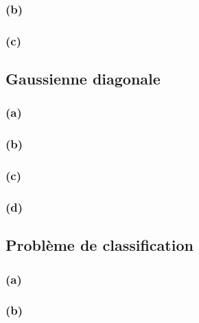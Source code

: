 \documentclass{article}
\begin{document}
	\subsubsection*{(b)}
	
	\subsubsection*{(c)}
	
	
	\subsection{Gaussienne diagonale}
	
	\subsubsection*{(a)}
	
	\subsubsection*{(b)}
	
	\subsubsection*{(c)}
	
	\subsubsection*{(d)}
	
	
	\subsection{Problème de classification}
		
	\subsubsection*{(a)}
		
	\subsubsection*{(b)}
	
\end{document}
